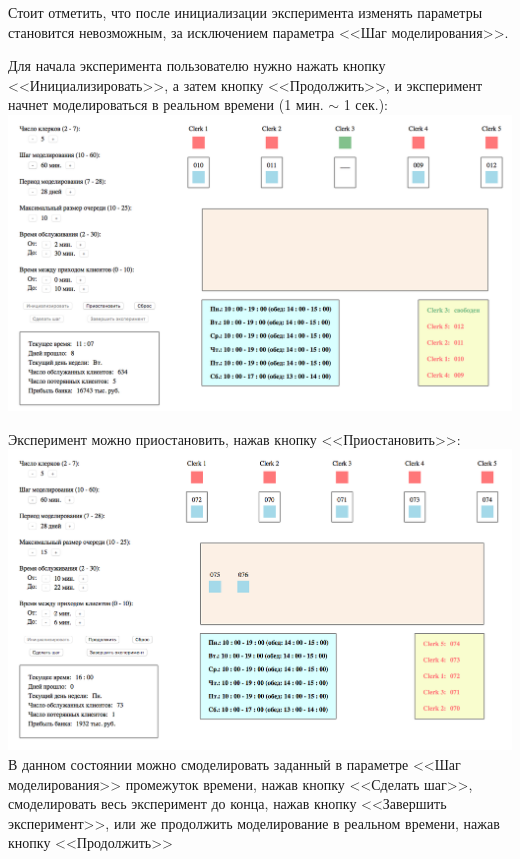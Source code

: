 \documentclass[oneside,final,12pt]{article}
\begin{document}
 Стоит отметить, что после инициализации эксперимента изменять параметры становится невозможным, за исключением параметра <<Шаг моделирования>>.\\
 
 \newpage
 
 Для начала эксперимента пользователю нужно нажать кнопку <<Инициализировать>>, а затем кнопку <<Продолжить>>, и эксперимент начнет моделироваться в реальном времени (1 мин. $\sim$ 1 сек.):\\
 
 \includegraphics[width=150mm]{processing.png}\\

 \newpage
 
Эксперимент можно приостановить, нажав кнопку <<Приостановить>>:\\

 \includegraphics[width=150mm]{paused.png}\\

В данном состоянии можно смоделировать заданный в параметре <<Шаг моделирования>> промежуток времени, нажав кнопку <<Сделать шаг>>, смоделировать весь эксперимент до конца, нажав кнопку <<Завершить эксперимент>>, или же продолжить моделирование в реальном времени, нажав кнопку <<Продолжить>>\\
\end{document}
